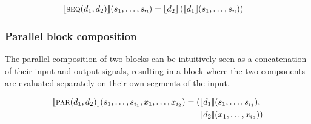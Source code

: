 \begin{minipage}{0.5\linewidth}
  \begin{prooftree}
  \end{prooftree}
  \begin{align*}
    \SigP{\Sequential(d_1, d_2)}(s_1, \dots, s_n)    ={} & \SigP{d_2}\left(\SigP{d_1}(s_1, \dots, s_n)\right)
  \end{align*}
\end{minipage}
\begin{minipage}{0.5\linewidth}
  \begin{figure}[H]
    \centering
    \label{fig:block_seq}
    
  \end{figure}
\end{minipage}

\subsubsection{Parallel block composition}
The parallel composition of two blocks can be intuitively seen as a concatenation of their input and output
signals, resulting in a block where the two components are evaluated separately on their own segments of the
input.

\begin{minipage}{0.5\linewidth}
  \begin{prooftree}
  \end{prooftree}
  \begin{align*}
    \SigP{\Parallel(d_1, d_2)}(s_1, \dots, s_{i_1}, x_1, \dots, x_{i_2}) ={} ( & \SigP{d_1}(s_1, \dots, s_{i_1}),   \\
                                                                               & \SigP{d_2}(x_{1}, \dots, x_{i_2})) \\
  \end{align*}
\end{minipage}
\begin{minipage}{0.5\linewidth}
  \begin{figure}[H]
    \centering
    \label{fig:block_par}
    
  \end{figure}
\end{minipage}

